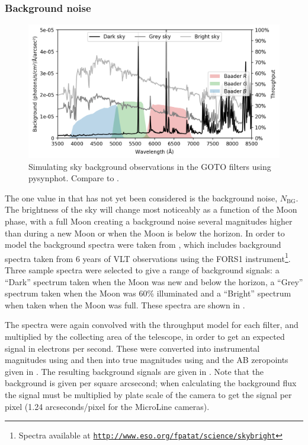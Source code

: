 \begin{colsection}
\begin{colsection}
\subsubsection{Background noise}

\begin{figure}[t]
    \begin{center}
        \includegraphics[width=\textwidth]{images/throughput/background.png}
    \end{center}
    \caption[Simulating sky background observations]{
        Simulating sky background observations in the GOTO filters using pysynphot. Compare to .
    }\label{fig:background}
\end{figure}

The one value in  that has not yet been considered is the background noise, $N_\text{BG}$. The brightness of the sky will change most noticeably as a function of the Moon phase, with a full Moon creating a background noise several magnitudes higher than during a new Moon or when the Moon is below the horizon. In order to model the background spectra were taken from \citet{sky_background}, which includes background spectra taken from 6 years of VLT observations using the FORS1 instrument\footnote{Spectra available at \href{http://www.eso.org/~fpatat/science/skybright}{\texttt{http://www.eso.org/\raisebox{0.5ex}{\texttildelow}fpatat/science/skybright}}}. Three sample spectra were selected to give a range of background signals: a ``Dark'' spectrum taken when the Moon was new and below the horizon, a ``Grey'' spectrum taken when the Moon was 60\% illuminated and a ``Bright'' spectrum when taken when the Moon was full. These spectra are shown in .

The spectra were again convolved with the throughput model for each filter, and multiplied by the collecting area of the telescope, in order to get an expected signal in electrons per second. These were converted into instrumental magnitudes using  and then into true magnitudes using  and the AB zeropoints given in . The resulting background signals are given in . Note that the background is given per square arcsecond; when calculating the background flux the signal must be multiplied by plate scale of the camera to get the signal per pixel (1.24 arcseconds/pixel for the MicroLine cameras).


\end{colsection}
\end{colsection}
